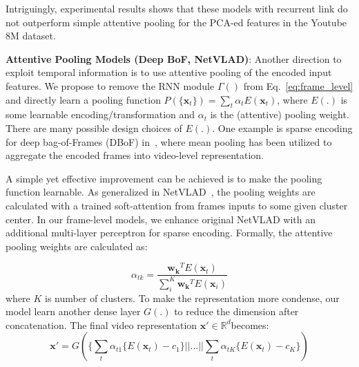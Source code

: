 \documentclass[10pt,twocolumn,letterpaper]{article}
\begin{document}
Intriguingly, experimental results shows that these models with recurrent link do not outperform simple attentive pooling for the PCA-ed features in the Youtube 8M dataset.


\textbf{Attentive Pooling Models (Deep BoF, NetVLAD)}:
Another direction to exploit temporal information is to use attentive pooling of the encoded input features. We propose to remove the RNN module $\Gamma()$ from Eq.~\ref{eq:frame_level} and directly learn a pooling function $P(\{\mathbf{x}_t\})=\sum_t{\alpha_t E(\mathbf{x}_t)}$, where $E(.)$ is some learnable encoding/transformation and $\alpha_t$ is the (attentive) pooling weight. There are many possible design choices of $E(.)$. One example is sparse encoding for deep bag-of-Frames (DBoF) in~\cite{yt8m}, where mean pooling has been utilized to aggregate the encoded frames into video-level representation.

A simple yet effective improvement can be achieved is to make the pooling function learnable. As generalized in NetVLAD~\cite{arandjelovic2016netvlad}, the pooling weights are calculated with a trained soft-attention from frames inputs to some given cluster center. In our frame-level models, we enhance original NetVLAD with an additional multi-layer perceptron for sparse encoding. Formally, the attentive pooling weights are calculated as:  

\begin{equation}
\alpha_{tk}=\frac{\mathbf{w_k}^TE(\mathbf{x}_t)}{\sum_i^K \mathbf{w_k}^TE(\mathbf{x}_i)}
\end{equation}
where $K$ is number of clusters. To make the representation more condense, our model learn another dense layer $G(.)$ to reduce the dimension after concatenation. The final video representation $\mathbf{x}' \in \mathbb{R}^d$becomes:
\begin{equation}
\mathbf{x}'= G(\{\sum_t \alpha_{t1} \{ E(\mathbf{x}_t)- c_1 \} || ... || \sum_t \alpha_{tK} \{ E(\mathbf{x}_t)- c_K \}) 
\end{equation}
\end{document}
